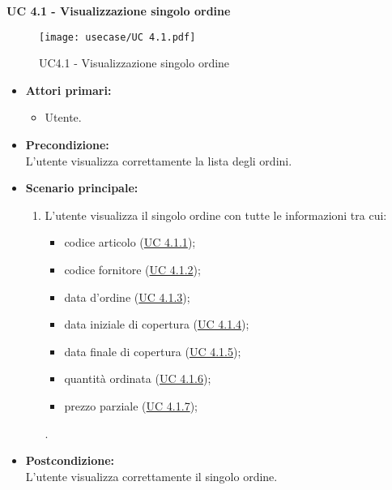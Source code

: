 \vspace{0.4cm}

\vspace*{\fill}

\noindent \textbf{\large UC 4.1 - Visualizzazione singolo ordine}
\begin{figure}[!h] 
    \centering 
    \texttt{[image: usecase/UC 4.1.pdf]} 
    \caption{UC4.1 - Visualizzazione singolo ordine}
\end{figure}
\label{uc:visualizzazione-singolo-ordine}
\begin{itemize}

	\item \textbf{Attori primari: }
		\begin{itemize}
			\item Utente.
		\end{itemize}

	\item \textbf{Precondizione: }\\[0.3cm]
		L'utente visualizza correttamente la lista degli ordini.
		
	\vspace*{\fill}

		\newpage
	
	\item \textbf{Scenario principale: }
		\begin{enumerate}
			\item L'utente visualizza il singolo ordine con tutte le informazioni tra cui:
			\begin{itemize}
				\item codice articolo (\hyperref[uc:visualizzazione-codice-articolo]{UC 4.1.1});
				\item codice fornitore (\hyperref[uc:visualizzazione-codice-fornitore]{UC 4.1.2});
				\item data d'ordine (\hyperref[uc:visualizzazione-data-ordine]{UC 4.1.3});
				\item data iniziale di copertura (\hyperref[uc:visualizzazione-data-iniziale-copertura]{UC 4.1.4});
				\item data finale di copertura (\hyperref[uc:visualizzazione-data-finale-copertura]{UC 4.1.5});
				\item quantità ordinata (\hyperref[uc:visualizzazione-quantita-ordinata]{UC 4.1.6});
				\item prezzo parziale (\hyperref[uc:visualizzazione-prezzo-parziale-ord]{UC 4.1.7});
			\end{itemize}.
		\end{enumerate}
		

	\item \textbf{Postcondizione: }\\[0.3cm]
		L'utente visualizza correttamente il singolo ordine.

\end{itemize}

